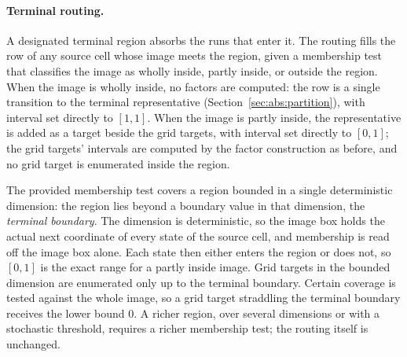 \documentclass[11pt,a4paper]{article}
\theoremstyle{plain}
\theoremstyle{remark}
\begin{document}
	\paragraph{Terminal routing.}
	A designated terminal region absorbs the runs that enter it. The
	routing fills the row of any source cell whose image meets the
	region, given a membership test that classifies the image as wholly
	inside, partly inside, or outside the region. When the image is
	wholly inside, no factors are computed: the row is a single
	transition to the terminal representative
	(Section~\ref{sec:abs:partition}), with interval set directly to
	$[1,1]$. When the image is partly inside, the representative is added
	as a target beside the grid targets, with interval set directly to
	$[0,1]$; the grid targets' intervals are computed by the factor
	construction as before, and no grid target is enumerated inside the
	region.
	
	The provided membership test covers a region bounded in a single
	deterministic dimension: the region lies beyond a boundary value in
	that dimension, the \emph{terminal boundary}. The dimension is
	deterministic, so the image box holds the actual next coordinate of
	every state of the source cell, and membership is read off the image
	box alone. Each state then either enters the region or does not, so
	$[0,1]$ is the exact range for a partly inside image. Grid targets in
	the bounded dimension are enumerated only up to the terminal
	boundary. Certain coverage is tested against the whole image, so a
	grid target straddling the terminal boundary receives the lower bound
	$0$. A richer region, over several dimensions or with a stochastic
	threshold, requires a richer membership test; the routing itself is
	unchanged.
	
\end{document}
